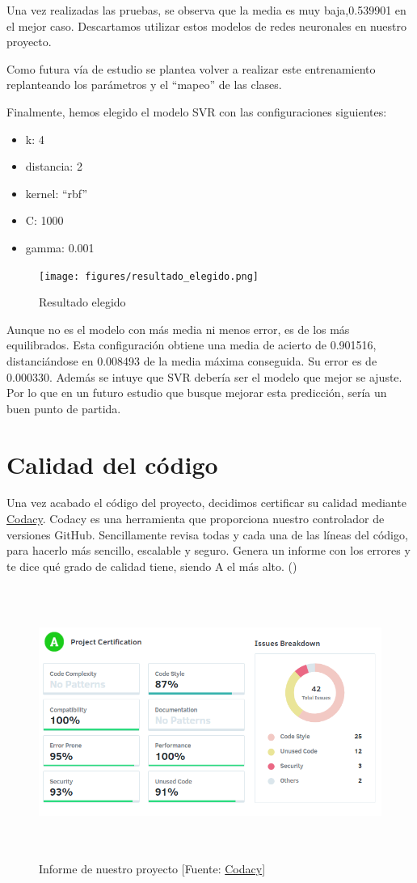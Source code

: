 Una vez realizadas las pruebas, se observa que la media es muy baja,0.539901 en el mejor caso. Descartamos utilizar estos modelos de redes neuronales en nuestro proyecto.

Como futura vía de estudio se plantea volver a realizar este entrenamiento replanteando los parámetros y el ``mapeo'' de las clases.

Finalmente, hemos elegido el modelo SVR con las configuraciones siguientes:

\begin{itemize}
	\item k: 4
	\item distancia: 2
	\item kernel: ``rbf''
	\item C: 1000
	\item gamma: 0.001
\end{itemize}

\begin{figure}[htb]
	\begin{center}
		\texttt{[image: figures/resultado\_elegido.png]}
		\caption{Resultado elegido \label{resultado_elegido}}
	\end{center}
\end{figure}

Aunque no es el modelo con más media ni menos error, es de los más equilibrados. Esta configuración obtiene una media de acierto de 0.901516, distanciándose en 0.008493 de la media máxima conseguida. Su error es de 0.000330. Además se intuye que SVR debería ser el modelo que mejor se ajuste. Por lo que en un futuro estudio que busque mejorar esta predicción, sería un buen punto de partida.

\section{Calidad del código}
\label{makereference7.4}

Una vez acabado el código del proyecto, decidimos certificar su calidad mediante \href{https://www.codacy.com}{Codacy}.
Codacy es una herramienta que proporciona nuestro controlador de versiones GitHub. Sencillamente revisa todas y cada una de las líneas del código, para hacerlo más sencillo, escalable y seguro. Genera un informe con los errores y te dice qué grado de calidad tiene, siendo A el más alto. (\cite{ARP:Codacy:2017})

\begin{figure}[htb]
	\begin{center}
		\includegraphics[height=3.5in]{figures/codacy.png}
		\caption{Informe de nuestro proyecto [Fuente: \href{https://www.codacy.com}{Codacy}] \label{codacy}}
	\end{center}
\end{figure}